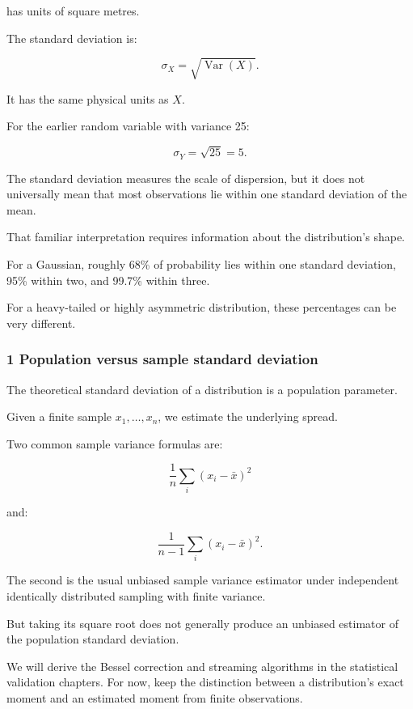 has units of square metres.

The standard deviation is:

\[
 \boxed{ \sigma_X=\sqrt{\operatorname{Var}(X)} }.
\]

It has the same physical units as \(X\).

For the earlier random variable with variance 25:

\[
 \sigma_Y=\sqrt{25}=5.
\]

The standard deviation measures the scale of dispersion, but it does not universally mean that most observations lie within one standard deviation of the mean.

That familiar interpretation requires information about the distribution's shape.

For a Gaussian, roughly 68\% of probability lies within one standard deviation, 95\% within two, and 99.7\% within three.

For a heavy-tailed or highly asymmetric distribution, these percentages can be very different.

\subsubsection{1 Population versus sample standard deviation}\label{02-foundations-ii-ch023-population-versus-sample-standard-deviation}

\hypertarget{02-foundations-ii-ch023-population-versus-sample-standard-deviation}{}

The theoretical standard deviation of a distribution is a population parameter.

Given a finite sample \(x_1,\ldots,x_n\), we estimate the underlying spread.

Two common sample variance formulas are:

\[
 \frac1n\sum_i(x_i-\bar x)^2
\]

and:

\[
 \frac1{n-1}\sum_i(x_i-\bar x)^2.
\]

The second is the usual unbiased sample variance estimator under independent identically distributed sampling with finite variance.

But taking its square root does not generally produce an unbiased estimator of the population standard deviation.

We will derive the Bessel correction and streaming algorithms in the statistical validation chapters. For now, keep the distinction between a distribution's exact moment and an estimated moment from finite observations.

